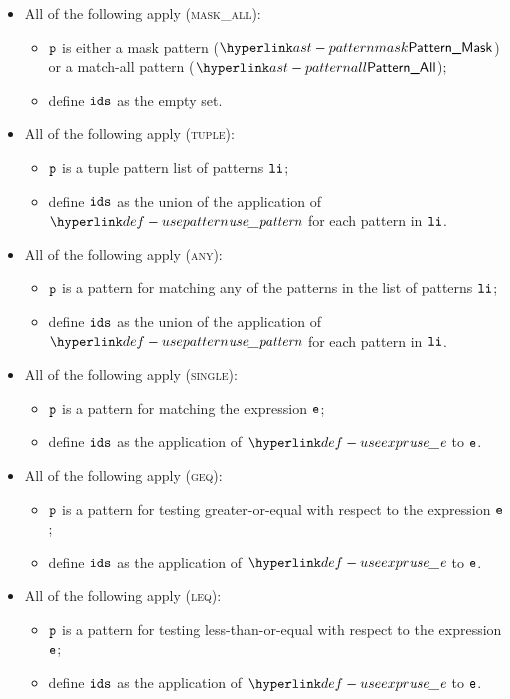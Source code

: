 \begin{itemize}
  \item All of the following apply (\textsc{mask\_all}):
  \begin{itemize}
    \item $\texttt{p}$ is either a mask pattern ($\PatternMask$) or a match-all pattern ($\PatternAll$);
    \item define $\texttt{ids}$ as the empty set.
  \end{itemize}

  \item All of the following apply (\textsc{tuple}):
  \begin{itemize}
    \item $\texttt{p}$ is a tuple pattern list of patterns $\texttt{li}$;
    \item define $\texttt{ids}$ as the union of the application of $\usepattern$ for each pattern in $\texttt{li}$.
  \end{itemize}

  \item All of the following apply (\textsc{any}):
  \begin{itemize}
    \item $\texttt{p}$ is a pattern for matching any of the patterns in the list of patterns $\texttt{li}$;
    \item define $\texttt{ids}$ as the union of the application of $\usepattern$ for each pattern in $\texttt{li}$.
  \end{itemize}

  \item All of the following apply (\textsc{single}):
  \begin{itemize}
    \item $\texttt{p}$ is a pattern for matching the expression $\texttt{e}$;
    \item define $\texttt{ids}$ as the application of $\useexpr$ to $\texttt{e}$.
  \end{itemize}

  \item All of the following apply (\textsc{geq}):
  \begin{itemize}
    \item $\texttt{p}$ is a pattern for testing greater-or-equal with respect to the expression $\texttt{e}$;
    \item define $\texttt{ids}$ as the application of $\useexpr$ to $\texttt{e}$.
  \end{itemize}

  \item All of the following apply (\textsc{leq}):
  \begin{itemize}
    \item $\texttt{p}$ is a pattern for testing less-than-or-equal with respect to the expression $\texttt{e}$;
    \item define $\texttt{ids}$ as the application of $\useexpr$ to $\texttt{e}$.
  \end{itemize}


\end{itemize}
